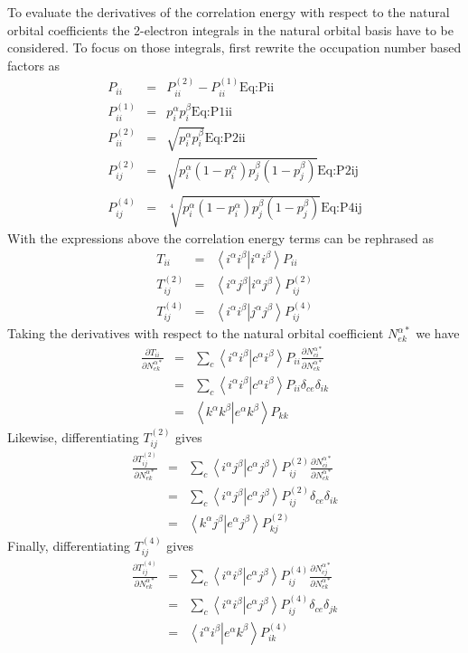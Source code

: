 \documentclass[pra,nofootinbib]{revtex4-1}
\newcommand{\eria}[4]{\left\langle #1^\alpha #2^\beta \right.\left| #3^\alpha #4^\beta \right\rangle}
\newcommand{\dlabel}[1]{\text{#1}\label{#1}}
\begin{document}
To evaluate the derivatives of the correlation energy with respect to the natural
orbital coefficients the 2-electron integrals in the natural orbital basis have
to be considered. To focus on those integrals, first rewrite the occupation number
based factors as
\begin{eqnarray}
   P_{ii}       &=& P^{(2)}_{ii}-P^{(1)}_{ii}                                 \dlabel{Eq:Pii}  \\
   P^{(1)}_{ii} &=& p^\alpha_i p^\beta_i                                      \dlabel{Eq:P1ii} \\
   P^{(2)}_{ii} &=& \sqrt{p^\alpha_i p^\beta_i}                               \dlabel{Eq:P2ii} \\
   P^{(2)}_{ij} &=& \sqrt{p^\alpha_i(1-p^\alpha_i) p^\beta_j(1-p^\beta_j)}    \dlabel{Eq:P2ij} \\
   P^{(4)}_{ij} &=& \sqrt[4]{p^\alpha_i(1-p^\alpha_i) p^\beta_j(1-p^\beta_j)} \dlabel{Eq:P4ij}
\end{eqnarray}
With the expressions above the correlation energy terms can be rephrased as
\begin{eqnarray}
   T_{ii}       &=& \eria{i}{i}{i}{i}P_{ii}       \\
   T^{(2)}_{ij} &=& \eria{i}{j}{i}{j}P^{(2)}_{ij} \\
   T^{(4)}_{ij} &=& \eria{i}{i}{j}{j}P^{(4)}_{ij}
\end{eqnarray}
Taking the derivatives with respect to the natural orbital coefficient $N^{\alpha*}_{ek}$ we have
\begin{eqnarray}
   \frac{\partial T_{ii}}{\partial N^{\alpha*}_{ek}}
   &=& \sum_c \eria{i}{i}{c}{i}P_{ii}
       \frac{\partial N^{\alpha*}_{ci}}{\partial N^{\alpha*}_{ek}} \\
   &=& \sum_c \eria{i}{i}{c}{i}P_{ii}\delta_{ce}\delta_{ik} \\
   &=& \eria{k}{k}{e}{k}P_{kk}
\end{eqnarray}
Likewise, differentiating $T^{(2)}_{ij}$ gives
\begin{eqnarray}
   \frac{\partial T^{(2)}_{ij}}{\partial N^{\alpha*}_{ek}}
   &=& \sum_c\eria{i}{j}{c}{j}P^{(2)}_{ij}
       \frac{\partial N^{\alpha*}_{ci}}{\partial N^{\alpha*}_{ek}} \\
   &=& \sum_c\eria{i}{j}{c}{j}P^{(2)}_{ij}\delta_{ce}\delta_{ik} \\
   &=& \eria{k}{j}{e}{j}P^{(2)}_{kj}
\end{eqnarray}
Finally, differentiating $T^{(4)}_{ij}$ gives
\begin{eqnarray}
   \frac{\partial T^{(4)}_{ij}}{\partial N^{\alpha*}_{ek}}
   &=& \sum_c\eria{i}{i}{c}{j}P^{(4)}_{ij}
       \frac{\partial N^{\alpha*}_{cj}}{\partial N^{\alpha*}_{ek}} \\
   &=& \sum_c\eria{i}{i}{c}{j}P^{(4)}_{ij}\delta_{ce}\delta_{jk} \\
   &=& \eria{i}{i}{e}{k}P^{(4)}_{ik}
\end{eqnarray}
\end{document}
